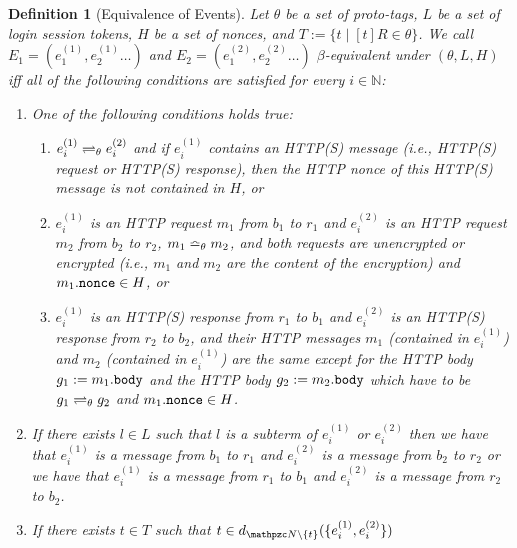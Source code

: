 \documentclass[letterpaper,onecolumn,10pt]{article}
\newtheorem{definition}{Definition}
\begin{document}
\begin{definition}[Equivalence of Events]\label{def:Events}
  Let $\theta$ be a set of proto-tags, 
  $L$ be a set of login session tokens, 
  $H$ be a set of nonces, and
  $T:=\{t\mid [t]R\in \theta\}$. 
  We call $E_1 = (e_1^{(1)}, e_2^{(1)}\dots)$ and
  $E_2= (e_1^{(2)}, e_2^{(2)} \dots)$ 
  \emph{$\beta$-equivalent under $(\theta, L, H)$} 
  iff all of the following conditions are satisfied for every 
  $i \in \mathbb{N}$:

  \begin{enumerate}
    \item\label{eqe:distinction} One of the following conditions holds
      true:
      \begin{enumerate}
      \item\label{eqe:prototagequiv}
        $e_i^{(1)} \rightleftharpoons_{\theta} e_i^{(2)}$ and if $e_i^{(1)}$
        contains an HTTP(S) message (i.e., HTTP(S) request or HTTP(S)
        response), then the HTTP nonce of this HTTP(S) message is not
        contained in $H$, or
      \item\label{eqe:http-req} $e_i^{(1)}$ is an HTTP request $m_1$
        from $b_1$ to $r_1$ and $e_i^{(2)}$ is an HTTP request $m_2$
        from $b_2$ to $r_2$, $m_1 \bumpeq_{\theta} m_2$, and both
        requests are unencrypted or encrypted (i.e., $m_1$ and $m_2$ are
        the content of the encryption) and $m_1.\mathtt{nonce} \in H$, or
      \item\label{eqe:http-res} $e_i^{(1)}$ is an HTTP(S) response from
        $r_1$ to $b_1$ and $e_i^{(2)}$ is an HTTP(S) response from $r_2$
        to $b_2$, and their HTTP messages $m_1$ (contained in
        $e_i^{(1)}$) and $m_2$ (contained in $e_i^{(1)}$) are the same
        except for the HTTP body $g_1 := m_1.\mathtt{body}$ and the HTTP
        body $g_2 := m_2.\mathtt{body}$ which have to be
        $g_1 \rightleftharpoons_{\theta} g_2$ and $m_1.\mathtt{nonce} \in H$.
      \end{enumerate}
    \item\label{eqe:pre:l} If there exists $l \in L$ such that $l$ is a
      subterm of $e_i^{(1)}$ or $e_i^{(2)}$ then we have that
      $e_i^{(1)}$ is a message from $b_1$ to $r_1$ and $e_i^{(2)}$ is a
      message from $b_2$ to $r_2$ or we have that $e_i^{(1)}$ is a
      message from $r_1$ to $b_1$ and $e_i^{(2)}$ is a message from
      $r_2$ to $b_2$.
    \item\label{eqe:pre:t} If there exists $t \in T$ such that
      $t \in d_{\nonces\setminus\{t\}}(\{e_i^{(1)}, e_i^{(2)}\})$ 

\end{enumerate}
\end{definition}
\end{document}
